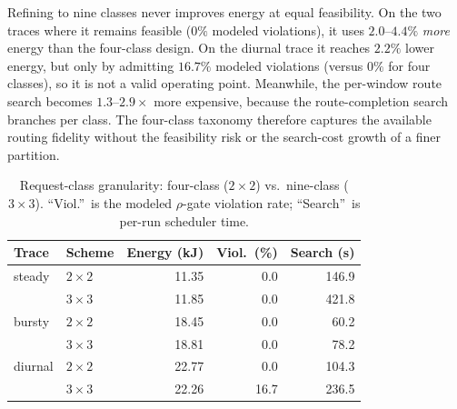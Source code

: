 Refining to nine classes never improves energy at equal feasibility. On the two traces where it remains feasible ($0\%$ modeled violations), it uses $2.0$--$4.4\%$ \emph{more} energy than the four-class design. On the diurnal trace it reaches $2.2\%$ lower energy, but only by admitting $16.7\%$ modeled violations (versus $0\%$ for four classes), so it is not a valid operating point. Meanwhile, the per-window route search becomes $1.3$--$2.9\times$ more expensive, because the route-completion search branches per class. The four-class taxonomy therefore captures the available routing fidelity without the feasibility risk or the search-cost growth of a finer partition.

\begin{table}[t]
\centering
\small
\caption{Request-class granularity: four-class ($2{\times}2$) vs.\ nine-class ($3{\times}3$). ``Viol.''~is the modeled $\rho$-gate violation rate; ``Search''~is per-run scheduler time.}
\label{tab:k_sensitivity}
\begin{tabular}{@{}llrrr@{}}
\toprule
Trace & Scheme & Energy (kJ) & Viol.\ (\%) & Search (s) \\
\midrule
steady  & $2{\times}2$ & 11.35 & 0.0 & 146.9 \\
        & $3{\times}3$ & 11.85 & 0.0 & 421.8 \\
\midrule
bursty  & $2{\times}2$ & 18.45 & 0.0 & 60.2 \\
        & $3{\times}3$ & 18.81 & 0.0 & 78.2 \\
\midrule
diurnal & $2{\times}2$ & 22.77 & 0.0 & 104.3 \\
        & $3{\times}3$ & 22.26 & 16.7 & 236.5 \\
\bottomrule
\end{tabular}
\end{table}
